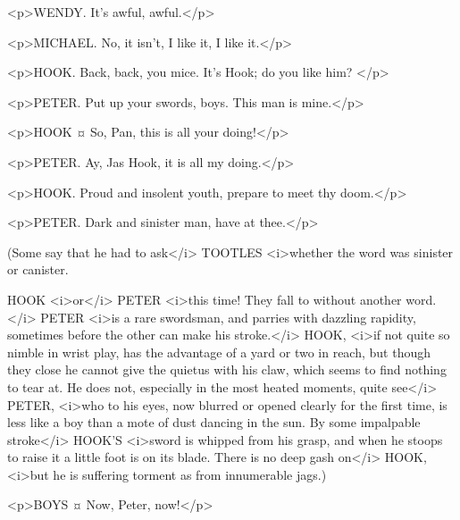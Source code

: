 <p>WENDY. It's awful, awful.</p>

<p>MICHAEL. No, it isn't, I like it, I like it.</p>


<p>HOOK. Back, back, you mice. It's Hook; do you like him?
</p>

<p>PETER. Put up your swords, boys. This man is mine.</p>


<p>HOOK ¤
So, Pan, this is all your doing!</p>

<p>PETER. Ay, Jas Hook, it is all my doing.</p>

<p>HOOK. Proud and insolent youth, prepare to meet thy doom.</p>

<p>PETER. Dark and sinister man, have at thee.</p>

\begin{stagedir}
(Some say that he had to ask</i> TOOTLES <i>whether the word was sinister or canister.

HOOK <i>or</i> PETER <i>this time! They fall to without another word.</i> PETER <i>is a rare swordsman, and parries with dazzling rapidity, sometimes before the other can make his stroke.</i> HOOK, <i>if not quite so nimble in wrist play, has the advantage of a yard or two in reach, but though they close he cannot give the quietus with his claw, which seems to find nothing to tear at. He does not, especially in the most heated moments, quite see</i> PETER, <i>who to his eyes, now blurred or opened clearly for the first time, is less like a boy than a mote of dust dancing in the sun. By some impalpable stroke</i> HOOK'S <i>sword is whipped from his grasp, and when he stoops to raise it a little foot is on its blade. There is no deep gash on</i> HOOK, <i>but he is suffering torment as from innumerable jags.)
\end{stagedir}

<p>BOYS ¤
Now, Peter, now!</p>


